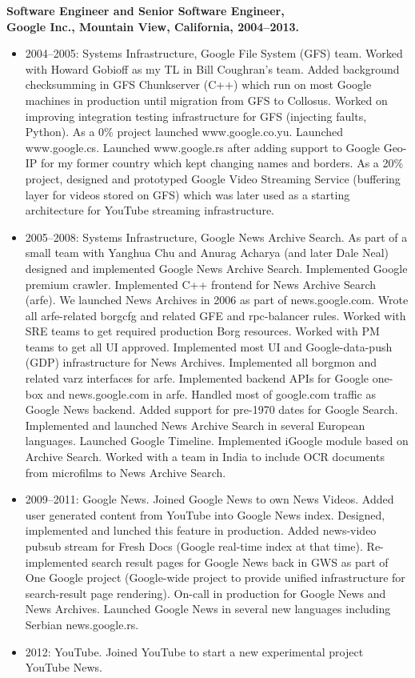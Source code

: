 \documentclass[10pt]{article}
\begin{document}
{\bf Software Engineer and Senior Software Engineer,\\
Google Inc., Mountain View, California, 2004--2013.}
\begin{itemize}
\vspace{-5pt}
\item
2004--2005: Systems Infrastructure, Google File System (GFS) team. Worked with Howard Gobioff as my TL in Bill Coughran's team. Added background checksumming in GFS Chunkserver (C++) which run on most Google machines in production until migration from GFS to Collosus. Worked on improving integration testing infrastructure for GFS (injecting faults, Python).
As a 0\% project launched www.google.co.yu. Launched www.google.cs. Launched www.google.rs after adding support to Google Geo-IP for my former country which kept changing names and borders. As a 20\% project, designed and prototyped Google Video Streaming Service (buffering layer for videos stored on GFS) which was later used as a starting architecture for YouTube streaming infrastructure.
\item
2005--2008: Systems Infrastructure, Google News Archive Search. As part of a small team with Yanghua Chu and Anurag Acharya (and later Dale Neal) designed and implemented Google News Archive Search. Implemented Google premium crawler. Implemented C++ frontend for News Archive Search (arfe). We launched News Archives in 2006 as part of news.google.com. Wrote all arfe-related borgcfg and related GFE and rpc-balancer rules. Worked with SRE teams to get required production Borg resources. Worked with PM teams to get all UI approved. Implemented most UI and Google-data-push (GDP) infrastructure for News Archives. Implemented all borgmon and related varz interfaces for arfe. Implemented backend APIs for Google one-box and news.google.com in arfe. Handled most of google.com traffic as Google News backend. Added support for pre-1970 dates for Google Search. Implemented and launched News Archive Search in several European languages. Launched Google Timeline. Implemented iGoogle module based on Archive Search. Worked with a team in India to include OCR documents from microfilms to News Archive Search.
\item
2009--2011: Google News. Joined Google News to own News Videos. Added user generated content from YouTube into Google News index. Designed, implemented and lunched this feature in production. Added news-video pubsub stream for Fresh Docs (Google real-time index at that time). Re-implemented search result pages for Google News back in GWS as part of One Google project (Google-wide project to provide unified infrastructure for search-result page rendering). On-call in production for Google News and News Archives. Launched Google News in several new languages including Serbian news.google.rs.
\item
2012: YouTube. Joined YouTube to start a new experimental project YouTube News.
\end{itemize}
\end{document}
